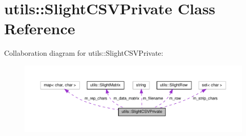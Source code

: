 \hypertarget{classutils_1_1SlightCSVPrivate}{}\section{utils\+:\+:Slight\+C\+S\+V\+Private Class Reference}
\label{classutils_1_1SlightCSVPrivate}


Collaboration diagram for utils\+:\+:Slight\+C\+S\+V\+Private\+:
\nopagebreak
\begin{figure}[H]
\begin{center}
\leavevmode
\includegraphics[width=350pt]{classutils_1_1SlightCSVPrivate__coll__graph}
\end{center}
\end{figure}
